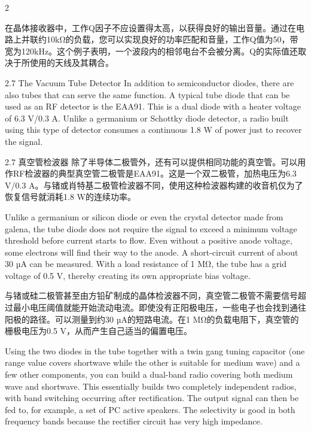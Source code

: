 \documentclass{ctexbook}
\begin{document}
\begin{paracol}{2}
\switchcolumn

在晶体接收器中，工作Q因子不应设置得太高，以获得良好的输出音量。通过在电路上并联约10kΩ的负载，您可以实现良好的功率匹配和音量，工作Q值为50，带宽为120kHz。这个例子表明，一个波段内的相邻电台不会被分离。Q的实际值还取决于所使用的天线及其耦合。

\switchcolumn*

2.7 The Vacuum Tube Detector 
In addition to semiconductor diodes, there are also tubes that can serve the same function. A 
typical tube diode that can be used as an RF detector is the EAA91. This is a dual diode with 
a heater voltage of 6.3 V/0.3 A. Unlike a germanium or Schottky diode detector, a radio built 
using this type of detector consumes a continuous 1.8 W of power just to recover the signal. 

\switchcolumn

2.7 真空管检波器
除了半导体二极管外，还有可以提供相同功能的真空管。可以用作RF检波器的典型真空管二极管是EAA91。这是一个双二极管，加热电压为6.3 V/0.3 A。与锗或肖特基二极管检波器不同，使用这种检波器构建的收音机仅为了恢复信号就消耗1.8 W的连续功率。

\switchcolumn*

Unlike a germanium or silicon diode or even the crystal detector made from galena, the 
tube diode does not require the signal to exceed a minimum voltage threshold before current starts to flow. Even without a positive anode voltage, some electrons will find their 
way to the anode. A short-circuit current of about 30 µA can be measured. With a load resistance of 1 MΩ, the tube has a grid voltage of 0.5 V, thereby creating its own appropriate 
bias voltage. 

\switchcolumn

与锗或硅二极管甚至由方铅矿制成的晶体检波器不同，真空管二极管不需要信号超过最小电压阈值就能开始流动电流。即使没有正阳极电压，一些电子也会找到通往阳极的路径。可以测量到约30 µA的短路电流。在1 MΩ的负载电阻下，真空管的栅极电压为0.5 V，从而产生自己适当的偏置电压。

\switchcolumn*

Using the two diodes in the tube together with a twin gang tuning capacitor (one range 
value covers shortwave while the other is suitable for medium wave) and a few other components, you can build a dual-band radio covering both medium wave and shortwave. This 
essentially builds two completely independent radios, with band switching occurring after 
rectification. The output signal can then be fed to, for example, a set of PC active speakers. 
The selectivity is good in both frequency bands because the rectifier circuit has very high 
impedance. 


\end{paracol}
\end{document}
